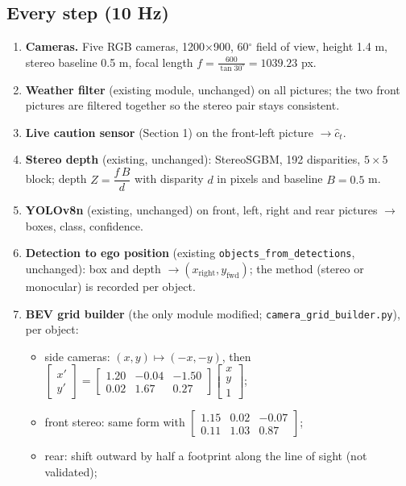 \documentclass[11pt,a4paper]{article}
\begin{document}
\subsection{Every step (10 Hz)}
\begin{enumerate}
\item \textbf{Cameras.} Five RGB cameras, 1200$\times$900, 60$^\circ$ field of view, height 1.4 m, stereo baseline 0.5 m, focal length $f=\tfrac{600}{\tan 30^\circ}=1039.23$ px.
\item \textbf{Weather filter} (existing module, unchanged) on all pictures; the two front pictures are filtered together so the stereo pair stays consistent.
\item \textbf{Live caution sensor} (Section 1) on the front-left picture $\to\hat c_t$.
\item \textbf{Stereo depth} (existing, unchanged): StereoSGBM, 192 disparities, $5{\times}5$ block; depth $Z=\dfrac{f\,B}{d}$ with disparity $d$ in pixels and baseline $B=0.5$ m.
\item \textbf{YOLOv8n} (existing, unchanged) on front, left, right and rear pictures $\to$ boxes, class, confidence.
\item \textbf{Detection to ego position} (existing \texttt{objects\_from\_detections}, unchanged): box and depth $\to(x_{\text{right}},y_{\text{fwd}})$; the method (stereo or monocular) is recorded per object.
\item \textbf{BEV grid builder} (the only module modified; \texttt{camera\_grid\_builder.py}), per object:
 \begin{itemize}
 \item side cameras: $(x,y)\mapsto(-x,-y)$, then $\begin{bmatrix}x'\\y'\end{bmatrix}=\begin{bmatrix}1.20&-0.04&-1.50\\0.02&1.67&0.27\end{bmatrix}\begin{bmatrix}x\\y\\1\end{bmatrix}$;
 \item front stereo: same form with $\begin{bmatrix}1.15&0.02&-0.07\\0.11&1.03&0.87\end{bmatrix}$;
 \item rear: shift outward by half a footprint along the line of sight (not validated);

\end{itemize}
\end{enumerate}
\end{document}
